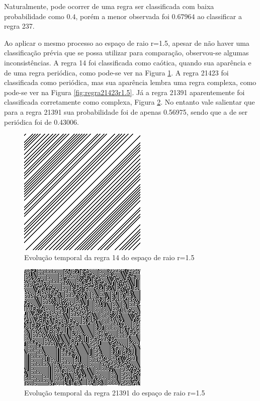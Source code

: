 \documentclass[12pt,a4paper]{report}
\begin{document}
	Naturalmente, pode ocorrer de uma regra ser classificada com baixa probabilidade como $0.4$, porém a menor observada foi $0.67964$ ao classificar a regra 237.
	
	Ao aplicar o mesmo processo ao espaço de raio r=1.5, apesar de não haver uma classificação prévia que se possa utilizar para comparação, observou-se algumas inconsistências. A regra 14 foi classificada como caótica, quando sua aparência e de uma regra periódica, como pode-se ver na Figura \ref{fig:regra14r1.5}. A regra 21423 foi classificada como periódica, mas sua aparência lembra uma regra complexa, como pode-se ver na Figura \ref{fig:regra21423r1.5}. Já a regra 21391 aparentemente foi classificada corretamente como complexa, Figura \ref{fig:regra21391r1.5}. No entanto vale salientar que para a regra 21391 sua probabilidade foi de apenas 0.56975, sendo que a de ser periódica foi de 0.43006.
	
	\begin{figure}[H]
		\centering
		\includegraphics[scale=1.0]{./img/ca_sample_14.png}
		\caption{Evolução temporal da regra 14 do espaço de raio r=1.5}
		\label{fig:regra14r1.5}
	\end{figure}
	
	\begin{figure}[H]
		\centering
		\includegraphics[scale=1.0]{./img/ca_sample_21391.png}
		\caption{Evolução temporal da regra 21391 do espaço de raio r=1.5}
		\label{fig:regra21391r1.5}
	\end{figure}
	
\end{document}
